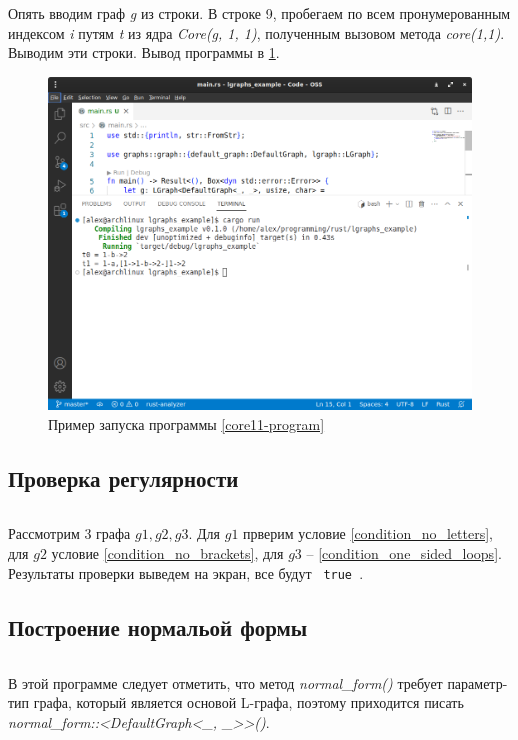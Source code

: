 Опять вводим граф \emph{g} из строки. В строке 9, пробегаем по всем пронумерованным индексом \emph{i} путям \emph{t} 
из ядра \emph{Core(g, 1, 1)}, полученным вызовом метода \emph{core(1,1)}. 
Выводим эти строки. Вывод программы в \ref{core11-out-image}.

\begin{figure}
    \centering
    \includegraphics[scale=0.4]{static_images/core11.png}
    \caption{Пример запуска программы \ref{core11-program}}
    \label{core11-out-image}
\end{figure}

\subsection{Проверка регулярности}
\inputminted[linenos]{rust}{../lgraphs/examples/reg.rs} \label{reg-program}

Рассмотрим 3 графа $g1,g2,g3$. Для $g1$ прверим условие \ref{condition_no_letters}, 
для $g2$ условие \ref{condition_no_brackets}, для $g3$ -- \ref{condition_one_sided_loops}.
Результаты проверки выведем на экран, все будут \verb | true |.

\subsection{Построение нормальой формы}
\inputminted[linenos]{rust}{../lgraphs/examples/normal.rs} \label{normal-program}

В этой программе следует отметить, что метод \emph{normal\_form()} требует параметр-тип графа, который является основой
L-графа, поэтому приходится писать \emph{normal\_form::<DefaultGraph<\_, \_>{}>()}.

